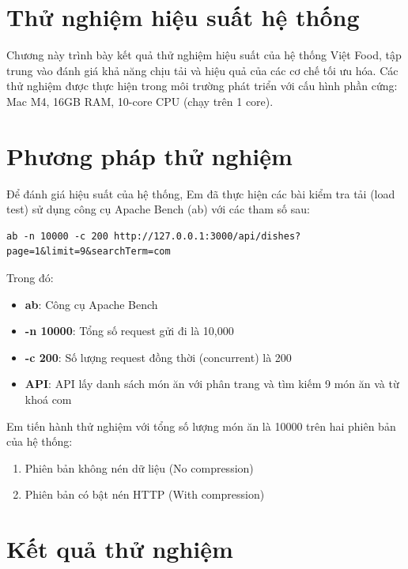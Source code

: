 \section{Thử nghiệm hiệu suất hệ thống}

Chương này trình bày kết quả thử nghiệm hiệu suất của hệ thống Việt Food, tập trung vào đánh giá khả năng chịu tải và hiệu quả của các cơ chế tối ưu hóa. Các thử nghiệm được thực hiện trong môi trường phát triển với cấu hình phần cứng: Mac M4, 16GB RAM, 10-core CPU (chạy trên 1 core).

\section{Phương pháp thử nghiệm}

Để đánh giá hiệu suất của hệ thống, Em đã thực hiện các bài kiểm tra tải (load test) sử dụng công cụ Apache Bench (ab) với các tham số sau:

\begin{verbatim}
ab -n 10000 -c 200 http://127.0.0.1:3000/api/dishes?page=1&limit=9&searchTerm=com
\end{verbatim}

Trong đó:
\begin{itemize}
    \item \textbf{ab}: Công cụ Apache Bench
    \item \textbf{-n 10000}: Tổng số request gửi đi là 10,000
    \item \textbf{-c 200}: Số lượng request đồng thời (concurrent) là 200
    \item \textbf{API}: API lấy danh sách món ăn với phân trang và tìm kiếm 9 món ăn và từ khoá com
\end{itemize}

Em tiến hành thử nghiệm với tổng số lượng món ăn là 10000 trên hai phiên bản của hệ thống:     
\begin{enumerate}
    \item Phiên bản không nén dữ liệu (No compression)
    \item Phiên bản có bật nén HTTP (With compression)
\end{enumerate}

\section{Kết quả thử nghiệm}

